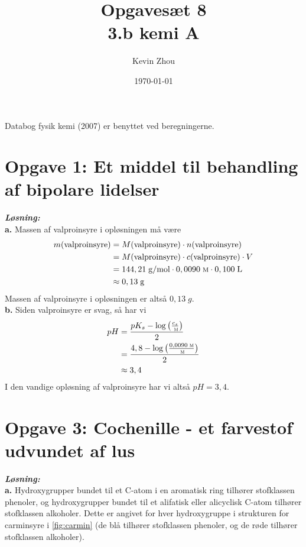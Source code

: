 \documentclass{report}
\title{Opgavesæt 8\\
{\Large \textbf{3.b kemi A}}}
\author{Kevin Zhou}
\date{\today}
\newcommand{\sol}{\setlength{\parindent}{0cm}\textbf{\textit{Løsning:}}\setlength{\parindent}{1cm}}
\begin{document}
\maketitle
\begin{note}
  Databog fysik kemi (2007) er benyttet ved beregningerne.
\end{note}
\section*{Opgave 1: Et middel til behandling af bipolare lidelser}
\sol \\
\textbf{a.}
Massen af valproinsyre i opløsningen må være
\begin{equation*}
\begin{split}
  m(\text{valproinsyre} )&=M(\text{valproinsyre} ) \cdot n(\text{valproinsyre} )\\
  &=M(\text{valproinsyre}) \cdot c(\text{valproinsyre}) \cdot V\\
  &=144,21 \;\unit{g/mol} \cdot 0,0090 \;\unit{\textsc{m}} \cdot 0,100 \;\unit{L} \\
  &\approx 0,13 \;\unit{g} 
\end{split}
\end{equation*}
Massen af valproinsyre i opløsningen er altså $0,13 \;\unit{g} $. \\[1ex]
\textbf{b.}
Siden valproinsyre er svag, så har vi
\begin{equation*}
\begin{split}
  pH&=\frac{pK_s-\log\left(\frac{c_s}{\;\unit{\textsc{m}} }\right) }{2}\\
  &=\frac{4,8- \log\left(\frac{0,0090 \;\unit{\textsc{m}} }{\;\unit{\textsc{m}} }\right) }{2}\\
  &\approx 3,4
\end{split}
\end{equation*}
I den vandige opløsning af valproinsyre har vi altså $pH=3,4$.

\section*{Opgave 3: Cochenille - et farvestof udvundet af lus}
\sol \\
\textbf{a.} 
Hydroxygrupper bundet til et C-atom i en aromatisk ring tilhører stofklassen phenoler, og hydroxygrupper bundet til et alifatisk eller alicyclisk C-atom tilhører stofklassen alkoholer.
Dette er angivet for hver hydroxygruppe i strukturen for carminsyre i \cref{fig:carmin} (de blå tilhører stofklassen phenoler, og de røde tilhører stofklassen alkoholer).
\end{document}
